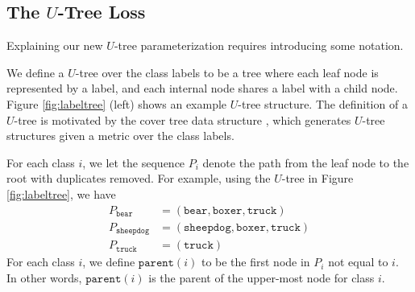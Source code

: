 \documentclass[twoside]{article}
\newcommand{\parent}[1]{\texttt{parent}({#1})}
\begin{document}
\subsection{The $U$-Tree Loss}

Explaining our new $U$-tree parameterization requires introducing some notation.

We define a $U$-tree over the class labels to be a tree where each leaf node is represented by a label,
and each internal node shares a label with a child node.
Figure \ref{fig:labeltree} (left) shows an example $U$-tree structure.
The definition of a $U$-tree is motivated by the cover tree data structure \citep{beygelzimer2006cover},
which generates $U$-tree structures given a metric over the class labels.

For each class $i$, we let the sequence $P_i$ denote the path from the leaf node to the root with duplicates removed.
For example, using the $U$-tree in Figure \ref{fig:labeltree},
we have
\begin{equation*}
\begin{split}
    P_{\texttt{bear}} &= (\texttt{bear}, \texttt{boxer}, \texttt{truck}) \\
    P_{\texttt{sheepdog}} &= (\texttt{sheepdog}, \texttt{boxer}, \texttt{truck}) \\
    P_{\texttt{truck}} &= (\texttt{truck})
\end{split}
\end{equation*}
For each class $i$, we define $\parent{i}$ to be the first node in $P_i$ not equal to $i$.
In other words, $\parent{i}$ is the parent of the upper-most node for class $i$.
\end{document}
